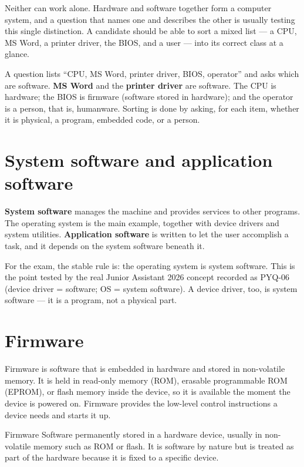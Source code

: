 Neither can work alone. Hardware and software together form a computer system,
and a question that names one and describes the other is usually testing this
single distinction. A candidate should be able to sort a mixed list --- a CPU,
MS Word, a printer driver, the BIOS, and a user --- into its correct class at a
glance.

\begin{example}
A question lists ``CPU, MS Word, printer driver, BIOS, operator'' and asks
which are software. \textbf{MS Word} and the \textbf{printer driver} are
software. The CPU is hardware; the BIOS is firmware (software stored in
hardware); and the operator is a person, that is, humanware. Sorting is done
by asking, for each item, whether it is physical, a program, embedded code, or
a person.
\end{example}

\section{System software and application software}
\textbf{System software} manages the machine and provides services to other
programs. The operating system is the main example, together with device
drivers and system utilities. \textbf{Application software} is written to let
the user accomplish a task, and it depends on the system software beneath it.

For the exam, the stable rule is: the operating system is system software.
This is the point tested by the real Junior Assistant 2026 concept recorded as
PYQ-06 (device driver = software; OS = system software). A device driver, too,
is system software --- it is a program, not a physical part.

\section{Firmware}
Firmware is software that is embedded in hardware and stored in non-volatile
memory. It is held in read-only memory (ROM), erasable programmable ROM
(EPROM), or flash memory inside the device, so it is available the moment the
device is powered on. Firmware provides the low-level control instructions a
device needs and starts it up.

\begin{definitionbox}{Firmware}
Software permanently stored in a hardware device, usually in non-volatile
memory such as ROM or flash. It is software by nature but is treated as part
of the hardware because it is fixed to a specific device.
\end{definitionbox}

